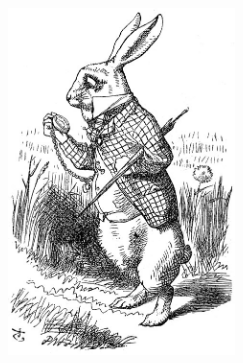 
\begin{titlepage}

\begin{addmargin}[-1cm]{-3cm}
\begin{center}
\large

\hfill
\vfill

\begingroup
\color{Maroon}\spacedallcaps{\myTitle} \\ \bigskip %
\mySubtitle \\ \medskip %
\endgroup

\spacedlowsmallcaps{\myName} %

\vfill

\includegraphics[width=6cm]{img/whiterabbit.jpg} \\ \medskip %

\myDegree \\
\myDepartment \\
\myUni \\ \bigskip

\myTime\ %

\vfill

\end{center}
\end{addmargin}

\end{titlepage}
